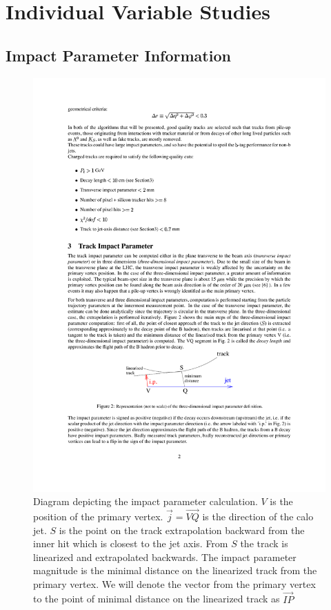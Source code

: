 \section{Individual Variable Studies}


\subsection{Impact Parameter Information}

\begin{figure}
\begin{center}
\includegraphics[width=.7\textwidth]{figures/an_jetid/DIAGRAMS/ip_diagram}
\end{center}
\caption{Diagram depicting the impact parameter calculation. $V$ is the position of the primary vertex. $\vec j = \vec{VQ}$ is the direction of 
the calo jet. $S$ is the point on the track extrapolation backward from the inner hit which is closest to the jet axis. From $S$ the track is
linearized and extrapolated backwards. The impact parameter magnitude is the minimal distance on the linearized track from the primary vertex. We
will denote the vector from the primary vertex to the point of minimal distance on the linearized track as $\vec{IP}$}
\label{fig:ipdiagram}
\end{figure}


